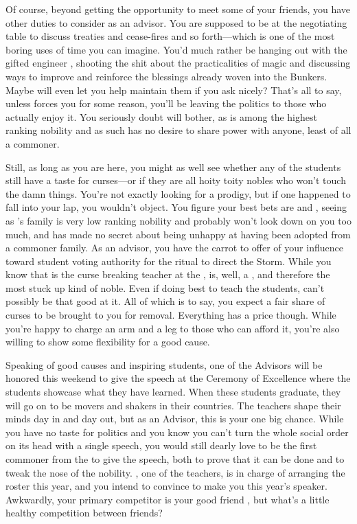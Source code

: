 \documentclass[char]{GL2020}
\begin{document}
Of course, beyond getting the opportunity to meet some of your friends, you have other duties to consider as an advisor. You are supposed to be at the negotiating table to discuss treaties and cease-fires and so forth---which is one of the most boring uses of time you can imagine. You'd much rather be hanging out with the gifted engineer \cBunker{\full}, shooting the shit about the practicalities of magic and discussing ways to improve and reinforce the blessings already woven into the Bunkers. Maybe \cBunker{\they} will even let you help maintain them if you ask nicely? That's all to say, unless \cEvil{\full} forces you for some reason, you'll be leaving the politics to those who actually enjoy it. You seriously doubt \cEvil{\they} will bother, as \cEvil{} is among the highest ranking nobility and as such has no desire to share power with anyone, least of all a commoner.

Still, as long as you are here, you might as well see whether any of the students still have a taste for curses---or if they are all hoity toity nobles who won't touch the damn things. You're not exactly looking for a prodigy, but if one happened to fall into your lap, you wouldn't object. You figure your best bets are \cLibAssist{\full} and \cAdopted{\full}, seeing as \cLibAssist{}'s family is very low ranking nobility and probably won't look down on you too much, and \cAdopted{} has made no secret about being unhappy at having been adopted from a commoner family. As an advisor, you have the carrot to offer of your influence toward student voting authority for the ritual to direct the Storm. While you know that \cPrince{\full} is the curse breaking teacher at the \pSc{}, \cPrince{} is, well, a \cPrince{\Heir}, and therefore the most stuck up kind of noble. Even if \cPrince{\they} \cPrince{\were} doing \cPrince{\their} best to teach the students, \cPrince{} can't possibly be that good at it. All of which is to say, you expect a fair share of curses to be brought to you for removal. Everything has a price though. While you're happy to charge an arm and a leg to those who can afford it, you're also willing to show some flexibility for a good cause.

Speaking of good causes and inspiring students, one of the Advisors will be honored this weekend to give the speech at the Ceremony of Excellence where the students showcase what they have learned. When these students graduate, they will go on to be movers and shakers in their countries. The teachers shape their minds day in and day out, but as an Advisor, this is your one big chance. While you have no taste for politics and you know you can't turn the whole social order on its head with a single speech, you would still dearly love to be the first commoner from the \pFarm{} to give the speech, both to prove that it can be done and to tweak the nose of the nobility. \cMusic{\full}, one of the teachers, is in charge of arranging the roster this year, and you intend to convince \cMusic{\them} to make you this year's speaker. Awkwardly, your primary competitor is your good friend \cHedonist{}, but what's a little healthy competition between friends?
\end{document}

